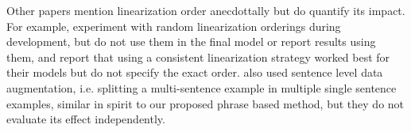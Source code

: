 Other papers mention linearization order anecdottally but do quantify its
impact. For example, \citet{juraska2018} experiment with random
linearization orderings during development, but do not use them in the final
model or report results using them, and \citet{gehrmann2018} report that
using a consistent linearization strategy worked best for their models but do
not specify the exact order.  \citet{juraska2018} also used sentence
level data augmentation, i.e. splitting a multi-sentence example in multiple
single sentence examples, similar in spirit to our proposed phrase based
method, but they do not evaluate its effect independently.



%


